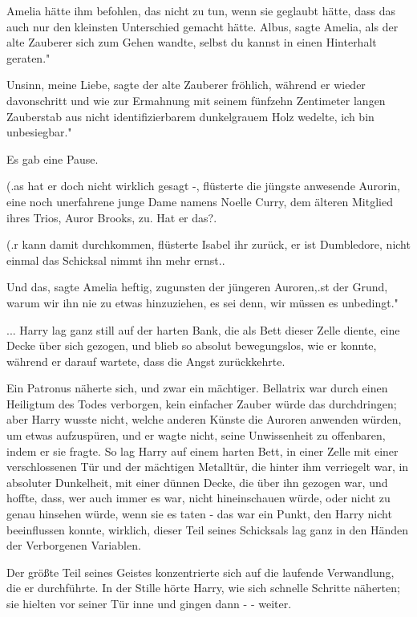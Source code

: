 Amelia hätte ihm befohlen, das nicht zu tun, wenn sie geglaubt hätte, dass das
auch nur den kleinsten Unterschied gemacht hätte. \glqq{}Albus\grqq{}, sagte
Amelia, als der alte Zauberer sich zum Gehen wandte, \glqq{}selbst du kannst in
einen Hinterhalt geraten."

\glqq{}Unsinn, meine Liebe\grqq{}, sagte der alte Zauberer fröhlich, während er
wieder davonschritt und wie zur Ermahnung mit seinem fünfzehn Zentimeter langen
Zauberstab aus nicht identifizierbarem dunkelgrauem Holz wedelte, \glqq{}ich bin
unbesiegbar."

Es gab eine Pause.

(\grqq{}.as hat er doch nicht wirklich gesagt -\grqq{}, flüsterte die jüngste
anwesende Aurorin, eine noch unerfahrene junge Dame namens Noelle Curry, dem
älteren Mitglied ihres Trios, Auror Brooks, zu. \glqq{}Hat er das?\grqq{}.

(\grqq{}.r kann damit durchkommen\grqq{}, flüsterte Isabel ihr zurück, \glqq{}er
ist Dumbledore, nicht einmal das Schicksal nimmt ihn mehr ernst.\grqq{}.

\glqq{}Und das\grqq{}, sagte Amelia heftig, zugunsten der jüngeren
Auroren,\grqq{}.st der Grund, warum wir ihn nie zu etwas hinzuziehen, es sei
denn, wir müssen es unbedingt."

... Harry lag ganz still auf der harten Bank, die als Bett dieser Zelle diente,
eine Decke über sich gezogen, und blieb so absolut bewegungslos, wie er konnte,
während er darauf wartete, dass die Angst zurückkehrte.

Ein Patronus näherte sich, und zwar ein mächtiger. Bellatrix war durch einen
Heiligtum des Todes verborgen, kein einfacher Zauber würde das durchdringen;
aber Harry wusste nicht, welche anderen Künste die Auroren anwenden würden, um
etwas aufzuspüren, und er wagte nicht, seine Unwissenheit zu offenbaren, indem
er sie fragte. So lag Harry auf einem harten Bett, in einer Zelle mit einer
verschlossenen Tür und der mächtigen Metalltür, die hinter ihm verriegelt war,
in absoluter Dunkelheit, mit einer dünnen Decke, die über ihn gezogen war, und
hoffte, dass, wer auch immer es war, nicht hineinschauen würde, oder nicht zu
genau hinsehen würde, wenn sie es taten - das war ein Punkt, den Harry nicht
beeinflussen konnte, wirklich, dieser Teil seines Schicksals lag ganz in den
Händen der Verborgenen Variablen.

Der größte Teil seines Geistes konzentrierte sich auf die laufende Verwandlung,
die er durchführte. In der Stille hörte Harry, wie sich schnelle Schritte
näherten; sie hielten vor seiner Tür inne und gingen dann - - weiter.

